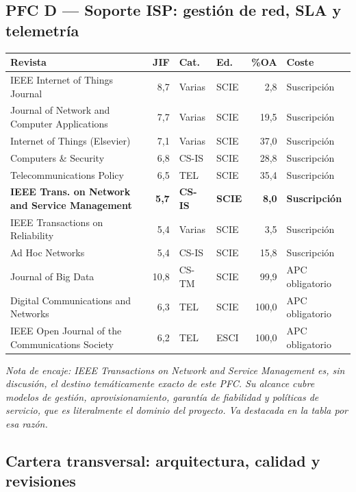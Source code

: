 \documentclass[11pt,a4paper]{article}
\newcommand{\jcrnote}[1]{{\footnotesize\itshape #1}}
\begin{document}
\subsection{PFC D --- Soporte ISP: gestión de red, SLA y telemetría}

\begin{center}
	\footnotesize
	\begin{longtable}{@{}p{6.2cm}rp{1.2cm}p{1.3cm}rp{3.4cm}@{}}
		\toprule
		\textbf{Revista} & \textbf{JIF} & \textbf{Cat.} & \textbf{Ed.} & \textbf{\%OA} & \textbf{Coste} \\
		\midrule
		\endhead
		IEEE Internet of Things Journal & 8,7 & Varias & SCIE & 2,8 & Suscripción \\
		Journal of Network and Computer Applications & 7,7 & Varias & SCIE & 19,5 & Suscripción \\
		Internet of Things (Elsevier) & 7,1 & Varias & SCIE & 37,0 & Suscripción \\
		Computers \& Security & 6,8 & CS-IS & SCIE & 28,8 & Suscripción \\
		Telecommunications Policy & 6,5 & TEL & SCIE & 35,4 & Suscripción \\
		\textbf{IEEE Trans. on Network and Service Management} & \textbf{5,7} & \textbf{CS-IS} & \textbf{SCIE} & \textbf{8,0} & \textbf{Suscripción} \\
		IEEE Transactions on Reliability & 5,4 & Varias & SCIE & 3,5 & Suscripción \\
		Ad Hoc Networks & 5,4 & CS-IS & SCIE & 15,8 & Suscripción \\
		\addlinespace
		Journal of Big Data & 10,8 & CS-TM & SCIE & 99,9 & APC obligatorio \\
		Digital Communications and Networks & 6,3 & TEL & SCIE & 100,0 & APC obligatorio \\
		IEEE Open Journal of the Communications Society & 6,2 & TEL & ESCI & 100,0 & APC obligatorio \\
		\bottomrule
	\end{longtable}
\end{center}

\jcrnote{Nota de encaje: \emph{IEEE Transactions on Network and Service Management} es, sin discusión, el destino temáticamente exacto de este PFC. Su alcance cubre modelos de gestión, aprovisionamiento, garantía de fiabilidad y políticas de servicio, que es literalmente el dominio del proyecto. Va destacada en la tabla por esa razón.}

\subsection{Cartera transversal: arquitectura, calidad y revisiones}
\end{document}

